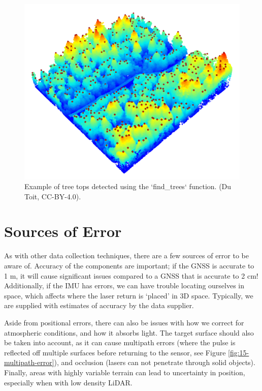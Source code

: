 \documentclass[
]{book}
\begin{document}
\begin{figure}
\includegraphics[width=0.8\linewidth]{images/15-las-treetops} \caption{Example of tree tops detected using the `find_trees` function. (Du Toit, CC-BY-4.0).}\label{fig:15-las-treetops}
\end{figure}

\hypertarget{sources-of-error-1}{%
\section{Sources of Error}\label{sources-of-error-1}}

As with other data collection techniques, there are a few sources of error to be aware of. Accuracy of the components are important; if the GNSS is accurate to 1 m, it will cause significant issues compared to a GNSS that is accurate to 2 cm! Additionally, if the IMU has errors, we can have trouble locating ourselves in space, which affects where the laser return is `placed' in 3D space. Typically, we are supplied with estimates of accuracy by the data supplier.

Aside from positional errors, there can also be issues with how we correct for atmospheric conditions, and how it absorbs light. The target surface should also be taken into account, as it can cause multipath errors (where the pulse is reflected off multiple surfaces before returning to the sensor, see Figure \ref{fig:15-multipath-error}), and occlusion (lasers can not penetrate through solid objects). Finally, areas with highly variable terrain can lead to uncertainty in position, especially when with low density LiDAR.
\end{document}
